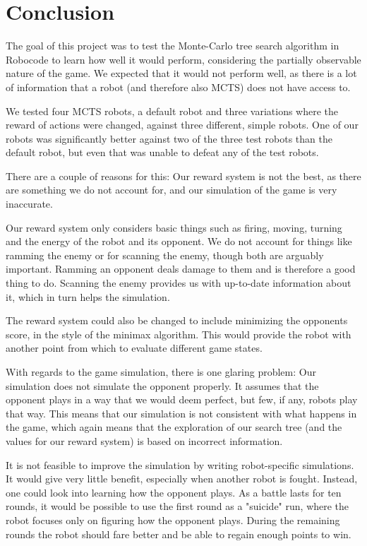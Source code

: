 \section{Conclusion}
\label{06}

The goal of this project was to test the Monte-Carlo tree search algorithm in Robocode to learn how well it would perform, considering the partially observable nature of the game. We expected that it would not perform well, as there is a lot of information that a robot (and therefore also MCTS) does not have access to.

We tested four MCTS robots, a default robot and three variations where the reward of actions were changed, against three different, simple robots. One of our robots was significantly better against two of the three test robots than the default robot, but even that was unable to defeat any of the test robots.

There are a couple of reasons for this: Our reward system is not the best, as there are something we do not account for, and our simulation of the game is very inaccurate.

Our reward system only considers basic things such as firing, moving, turning and the energy of the robot and its opponent. We do not account for things like ramming the enemy or for scanning the enemy, though both are arguably important. Ramming an opponent deals damage to them and is therefore a good thing to do. Scanning the enemy provides us with up-to-date information about it, which in turn helps the simulation.

The reward system could also be changed to include minimizing the opponents score, in the style of the minimax algorithm. This would provide the robot with another point from which to evaluate different game states.

With regards to the game simulation, there is one glaring problem: Our simulation does not simulate the opponent properly. It assumes that the opponent plays in a way that we would deem perfect, but few, if any, robots play that way. This means that our simulation is not consistent with what happens in the game, which again means that the exploration of our search tree (and the values for our reward system) is based on incorrect information.

It is not feasible to improve the simulation by writing robot-specific simulations. It would give very little benefit, especially when another robot is fought. Instead, one could look into learning how the opponent plays. As a battle lasts for ten rounds, it would be possible to use the first round as a "suicide" run, where the robot focuses only on figuring how the opponent plays. During the remaining rounds the robot should fare better and be able to regain enough points to win.

